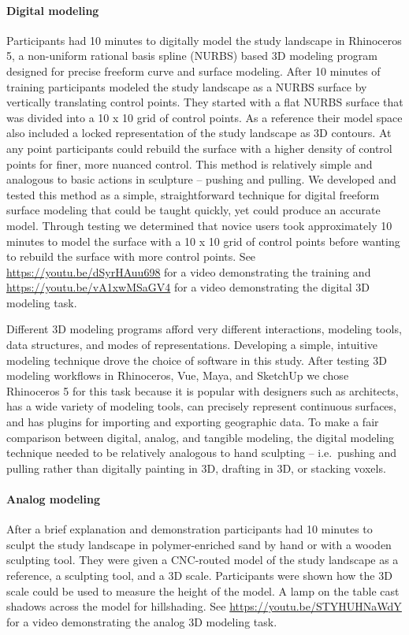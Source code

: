 \documentclass[Afour,sagev,times]{sagej} %
\begin{document}
\paragraph{Digital modeling}
Participants had 10 minutes 
to digitally model the study landscape in Rhinoceros 5, 
a non-uniform rational basis spline 
(NURBS) based 3D modeling program
designed for precise freeform curve and surface modeling. \cite{Rhino}
After 10 minutes of training 
participants modeled the study landscape as a NURBS surface 
by vertically translating control points. 
They started with a flat NURBS surface that was 
divided into a 10 x 10 grid of control points.
As a reference their model space also included 
a locked representation of the study landscape as 3D contours. 
At any point participants could rebuild the surface 
with a higher density of control points for finer, more nuanced control. 
This method is relatively simple and 
analogous to basic actions in sculpture -- pushing and pulling. 
We developed and tested this method 
as a simple, straightforward technique for  
digital freeform surface modeling
that could be taught quickly, yet could produce an accurate model. 
Through testing we determined that 
novice users took approximately 10 minutes
to model the surface with a 10 x 10 grid of control points
before wanting to rebuild the surface with more control points.
See \url{https://youtu.be/dSyrHAuu698}
for a video demonstrating the training
and \url{https://youtu.be/vA1xwMSaGV4}
for a video demonstrating the digital 3D modeling task.

Different 3D modeling programs afford very different
interactions, modeling tools, data structures, and modes of representations. 
Developing a simple, intuitive modeling technique 
drove the choice of software in this study. 
After testing 3D modeling workflows in 
Rhinoceros, Vue, Maya, and SketchUp
we chose Rhinoceros 5 for this task because it 
is popular with designers such as architects, 
has a wide variety of modeling tools,
can precisely represent continuous surfaces, 
and has plugins for importing and exporting geographic data. 
To make a fair comparison 
between digital, analog, and tangible modeling,
the digital modeling technique 
needed to be relatively analogous to hand sculpting
-- i.e.~pushing and pulling rather than 
digitally painting in 3D, drafting in 3D, or stacking voxels.

\paragraph{Analog modeling}
After a brief explanation and demonstration
participants had 10 minutes to sculpt 
the study landscape in polymer-enriched sand 
by hand or with a wooden sculpting tool.
They were given a CNC-routed model of the study landscape 
as a reference, a sculpting tool, and a 3D scale. 
Participants were shown how the 3D scale could be used to 
measure the height of the model. 
A lamp on the table cast shadows across the model for hillshading.
See \url{https://youtu.be/STYHUHNaWdY}
for a video demonstrating the analog 3D modeling task.
\end{document}
